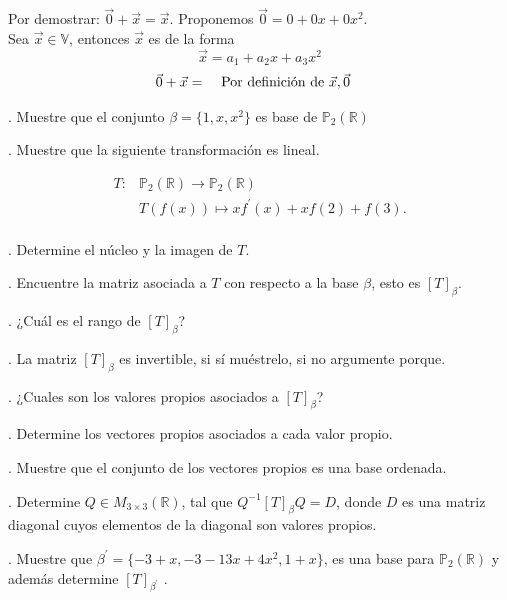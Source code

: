 \documentclass[letterpaper]{article}
\newcommand{\V}{\mathds{V}}
\renewcommand{\*}{\cdot}
\theoremstyle{definition}
\begin{document}
Por demostrar: $ \vec{0} + \vec{x} = \vec{x} $. Proponemos $ \vec{0} = 0 + 0x + 0x^2 $. \\
Sea $ \vec{x} \in \V $, entonces $ \vec{x} $ es de la forma \[ \vec{x} = a_1 + a_2x + a_3x^2  \]
\begin{align*}
	\vec{0} + \vec{x} &=  && \text{ Por definición de $ \vec{x}, \vec{0} $}
\end{align*}


. Muestre que el conjunto  $\beta =  \{ 1, x , x^2 \}$ es base de $ \mathbb{P}_{2}(\mathbb{R})$

. Muestre que la siguiente transformación es lineal.

\begin{align*}
     T \colon & \mathbb{P}_{2}(\mathbb{R})  \longrightarrow \mathbb{P}_{2}(\mathbb{R}) \\
     & T(f(x)) \mapsto  xf^{'}(x) +x f(2) + f(3). \\
 \end{align*}

. Determine el núcleo y la imagen de $T$.

. Encuentre la matriz asociada a $T$ con respecto a la base $\beta$, esto es $[T]_{\beta}$.

. ¿Cuál es el rango de $[T]_{\beta}$?

. La matriz $[T]_{\beta}$ es invertible, si sí muéstrelo, si no argumente porque.

. ¿Cuales son los valores propios asociados a $[T]_{\beta}$?

. Determine los vectores propios asociados a cada valor propio. 

. Muestre que el conjunto de los vectores propios es una base ordenada.

. Determine $Q \in M_{3\times 3}(\mathbb{R})$, tal que $Q^{-1}[T]_{\beta} Q = D$, donde $D$ es una matriz diagonal cuyos elementos de la diagonal son valores propios.

. Muestre que $\beta^{'} =\{ -3+x , -3-13x + 4x^2, 1+x \}$, es una base para $ \mathbb{P}_{2}(\mathbb{R})$ y además determine $[T]_{\beta^{'}}$ .
\end{document}
